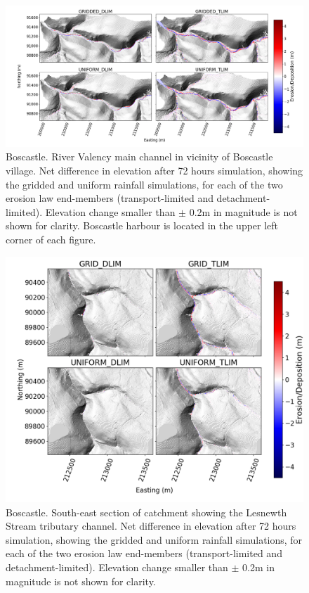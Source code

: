 
\begin{figure}
\includegraphics[width=25cm]{chp06_figures_scripts/figure_boscastle_erosion_diff_ensemble.png}
\caption{Boscastle. River Valency main channel in vicinity of Boscastle village. Net difference in elevation after 72 hours simulation, showing the gridded and uniform rainfall simulations, for each of the two erosion law end-members (transport-limited and detachment-limited). Elevation change smaller than \(\pm\) 0.2m in magnitude is not shown for clarity. Boscastle harbour is located in the upper left corner of each figure.}
\label{fig_boscastle_2dplan_erosion_ensemble}
\end{figure}

\begin{figure}
\includegraphics[width=18cm]{chp06_figures_scripts/figure_boscastle_erosion_diff_ensemble_SE.png}
\caption{Boscastle. South-east section of catchment showing the Lesnewth Stream tributary channel. Net difference in elevation after 72 hours simulation, showing the gridded and uniform rainfall simulations, for each of the two erosion law end-members (transport-limited and detachment-limited). Elevation change smaller than \(\pm\) 0.2m in magnitude is not shown for clarity. }
\label{fig_boscastle_2dplan_erosion_ensemble_SE}
\end{figure}

